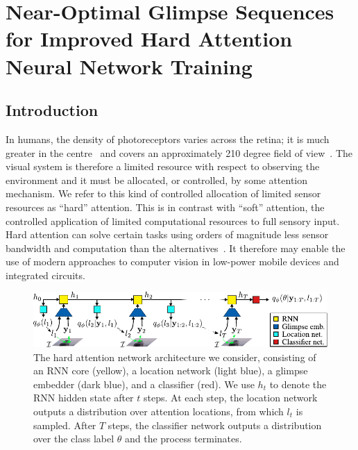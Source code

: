\chapter{Near-Optimal Glimpse Sequences for Improved Hard Attention Neural Network Training }

\section{Introduction}
\label{sec:nogs-introduction}
In humans, the density of photoreceptors varies across the retina; it is much
greater in the centre~\cite{bear2007neuroscience} and covers an approximately
210 degree field of view~\cite{traquair1949introduction}. The visual system is
therefore a limited resource with respect to observing the environment and it
must be allocated, or controlled, by some attention mechanism. We refer to this
kind of controlled allocation of limited sensor resources as ``hard'' attention.
This is in contrast with ``soft'' attention, the controlled application of
limited computational resources to full sensory input. Hard attention can solve
certain tasks using orders of magnitude less sensor bandwidth and computation
than the alternatives~\cite{katharopoulos2019processing, rensink2000dynamic}.
It therefore may enable the use of modern approaches to computer vision in
low-power mobile devices and integrated circuits.

\begin{figure}[t]
  \centering
  \includegraphics[scale=1]{figs/nogs/hard-attention-architecture}
  \caption{The hard attention network architecture we consider, consisting of an
    RNN core (yellow), a location network (light blue), a glimpse embedder (dark
    blue), and a classifier (red). We use $h_t$ to denote the RNN hidden state
    after $t$ steps. At each step, the location network outputs a distribution
    over attention locations, from which $l_t$ is sampled. After $T$ steps, the
    classifier network outputs a distribution over the class label $\theta$ and
    the process terminates. }
  \label{fig:hard-attention-architecture}
\end{figure}

